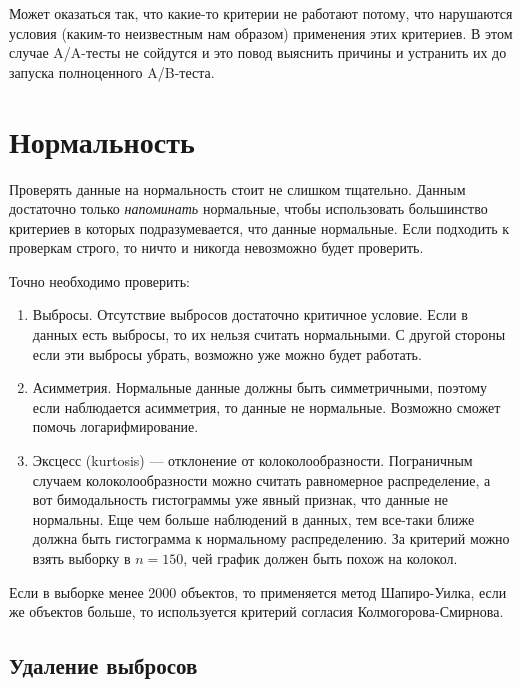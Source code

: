 \documentclass[../handbook.tex]{subfiles}
\begin{document}
Может оказаться так, что какие-то критерии не работают потому, что нарушаются
условия (каким-то неизвестным нам образом) применения этих критериев. В этом
случае A/A-тесты не сойдутся и это повод выяснить причины и устранить их до
запуска полноценного A/B-теста.

\section{Нормальность}
Проверять данные на нормальность стоит не слишком тщательно. Данным достаточно только \emph{напоминать} нормальные, чтобы использовать большинство критериев в которых подразумевается, что данные нормальные. Если подходить к проверкам строго, то ничто и никогда невозможно будет проверить. 

Точно необходимо проверить:
\begin{enumerate}
    \item Выбросы. Отсутствие выбросов достаточно критичное условие. Если в данных есть выбросы, то их нельзя считать нормальными. С другой стороны если эти выбросы убрать, возможно уже можно будет работать.

    
    \item Асимметрия.\marginnote{ \[A = \frac{\mu_3}{\sigma^3}\]}
        Нормальные данные должны быть симметричными, поэтому если наблюдается асимметрия, то данные не нормальные. Возможно сможет помочь логарифмирование. 

    \item Эксцесс (kurtosis) --- отклонение от колоколообразности.
        \marginnote{ \[\gamma_2 = \frac{\mu_4}{\sigma^4} - 3\]}
        Пограничным случаем колоколообразности можно считать равномерное распределение, а вот бимодальность гистограммы уже явный признак, что данные не нормальны. Еще чем больше наблюдений в данных, тем все-таки ближе должна быть гистограмма к нормальному распределению. За критерий можно взять выборку в $n=150$, чей график должен быть похож на колокол.
\end{enumerate}

Если в выборке менее 2000 объектов, то применяется метод Шапиро-Уилка, если же объектов больше, то используется критерий согласия Колмогорова-Смирнова.

\subsection{Удаление выбросов}
\end{document}
